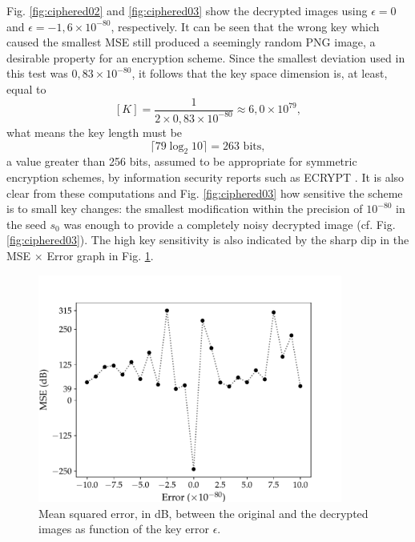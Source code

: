 Fig. \ref{fig:ciphered02} and \ref{fig:ciphered03} show the decrypted images using $ \epsilon = 0 $ and $ \epsilon = -1{,}6 \times 10^{-80} $, respectively. It can be seen that the wrong key which caused the smallest MSE still produced a seemingly random PNG image, a desirable property for an encryption scheme. Since the smallest deviation used in this test was $ 0{,}83 \times 10^{-80} $, it follows that the key space dimension is, at least, equal to
\begin{equation}
[K] = \frac{1}{2 \times 0{,}83 \times 10^{-80}} \approx 6{,}0 \times 10^{79},
\end{equation}
what means the key length must be
\begin{equation}
\lceil 79 \log_2 10 \rceil = 263\text{ bits},
\end{equation}
a value greater than 256 bits, assumed to be appropriate for symmetric encryption schemes, by information security reports such as ECRYPT \cite{smart2018algorithms}. It is also clear from these computations and Fig. \ref{fig:ciphered03} how sensitive the scheme is to small key changes: the smallest modification within the precision of $ 10^{-80} $ in the seed $ s_0 $ was enough to provide a completely noisy decrypted image (cf. Fig. \ref{fig:ciphered03}). The high key sensitivity is also indicated by the sharp dip in the MSE $\times $ Error graph in Fig. \ref{fig:MSE}.
%
%
\begin{figure}
\centering
\includegraphics[width=10cm]{Figures/MSEdb_FrQDFT_EN.pdf}
\caption{Mean squared error, in dB, between the original and the decrypted images as function of the key error $ \epsilon $.}
\label{fig:MSE}
\end{figure}
%

